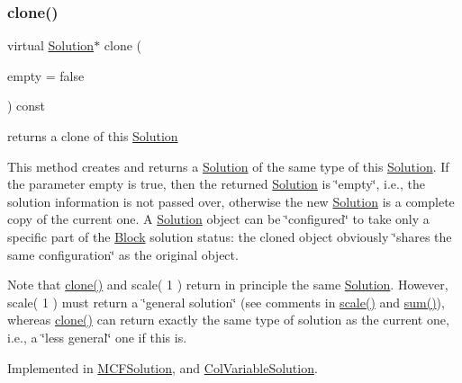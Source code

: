 \subsubsection{\texorpdfstring{clone()}{clone()}}
{\footnotesize\ttfamily virtual \mbox{\hyperlink{class_s_m_spp__di__unipi__it_1_1_solution}{Solution}}$\ast$ clone (\begin{DoxyParamCaption}\item[{bool}]{empty = {\ttfamily false} }\end{DoxyParamCaption}) const\hspace{0.3cm}{\ttfamily [pure virtual]}}



returns a clone of this \mbox{\hyperlink{class_s_m_spp__di__unipi__it_1_1_solution}{Solution}} 

This method creates and returns a \mbox{\hyperlink{class_s_m_spp__di__unipi__it_1_1_solution}{Solution}} of the same type of this \mbox{\hyperlink{class_s_m_spp__di__unipi__it_1_1_solution}{Solution}}. If the parameter empty is true, then the returned \mbox{\hyperlink{class_s_m_spp__di__unipi__it_1_1_solution}{Solution}} is \char`\"{}empty\char`\"{}, i.\+e., the solution information is not passed over, otherwise the new \mbox{\hyperlink{class_s_m_spp__di__unipi__it_1_1_solution}{Solution}} is a complete copy of the current one. A \mbox{\hyperlink{class_s_m_spp__di__unipi__it_1_1_solution}{Solution}} object can be \char`\"{}configured\char`\"{} to take only a specific part of the \mbox{\hyperlink{class_s_m_spp__di__unipi__it_1_1_block}{Block}} solution status\+: the cloned object obviously \char`\"{}shares the same configuration\char`\"{} as the original object.

Note that \mbox{\hyperlink{class_s_m_spp__di__unipi__it_1_1_solution_a02ecf9046100701d7bcc800deaa5717b}{clone()}} and scale( 1 ) return in principle the same \mbox{\hyperlink{class_s_m_spp__di__unipi__it_1_1_solution}{Solution}}. However, scale( 1 ) must return a \char`\"{}general solution\char`\"{} (see comments in \mbox{\hyperlink{class_s_m_spp__di__unipi__it_1_1_solution_abf1a2d1763f128a72b2677d4b9ff4d3b}{scale()}} and \mbox{\hyperlink{class_s_m_spp__di__unipi__it_1_1_solution_adc2450947fd142657637bf79d91505a9}{sum()}}), whereas \mbox{\hyperlink{class_s_m_spp__di__unipi__it_1_1_solution_a02ecf9046100701d7bcc800deaa5717b}{clone()}} can return exactly the same type of solution as the current one, i.\+e., a \char`\"{}less general\char`\"{} one if this is. 

Implemented in \mbox{\hyperlink{class_s_m_spp__di__unipi__it_1_1_m_c_f_solution_a0bf2bed8ce0c86fbf2a3c7a312d3462a}{M\+C\+F\+Solution}}, and \mbox{\hyperlink{class_s_m_spp__di__unipi__it_1_1_col_variable_solution_a3088fd7540cc9da5a5539a4c9deea8ea}{Col\+Variable\+Solution}}.

